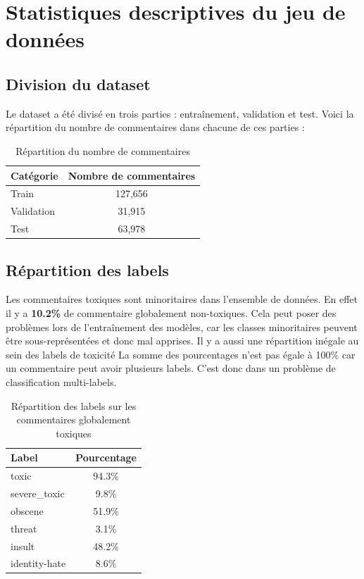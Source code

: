 \chapter{Statistiques descriptives du jeu de données}
\section*{Division du dataset}
Le dataset a été divisé en trois parties : entraînement, validation et test. Voici la répartition du nombre de commentaires dans chacune de ces parties :
\begin{table}[h]
\centering
\begin{tabular}{lc}
\toprule
\textbf{Catégorie} & \textbf{Nombre de commentaires} \\
\midrule
Train & 127,656 \\
Validation & 31,915 \\
Test & 63,978 \\
\bottomrule
\end{tabular}
\caption{Répartition du nombre de commentaires}
\end{table}


\section*{Répartition des labels}
Les commentaires toxiques sont minoritaires dans l'ensemble de données. 
En effet il y a \textbf{10.2\%} de commentaire globalement non-toxiques. 
Cela peut poser des problèmes lors de l'entraînement des modèles, car les classes minoritaires peuvent être sous-représentées et donc mal apprises.
Il y a aussi une répartition inégale au sein des labels de toxicité
La somme des pourcentages n'est pas égale à 100\% car un commentaire peut avoir plusieurs labels. 
C'est donc dans un problème de classification multi-labels.
\begin{table}[h]
\centering
\begin{tabular}{lc}
\toprule
\textbf{Label} & \textbf{Pourcentage} \\
\midrule
toxic & 94.3\% \\
severe\_toxic & 9.8\% \\
obscene & 51.9\% \\
threat & 3.1\% \\
insult & 48.2\% \\
identity-hate & 8.6\% \\ %
\bottomrule
\end{tabular}
\caption{Répartition des labels sur les commentaires globalement toxiques}
\end{table}


